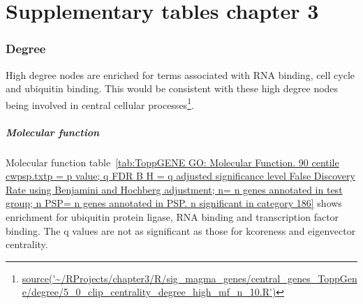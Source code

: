 \chapter{Supplementary tables chapter 3}
\subsection{Degree}
High degree nodes are enriched for terms associated with RNA binding, cell cycle and ubiquitin binding. This would be consistent with these high degree nodes being involved in central cellular processes\footnote{\url{source('~/RProjects/chapter3/R/sig_magma_genes/central_genes_ToppGene/degree/5_0_clip_centrality_degree_high_mf_n_10.R')}}.

\paragraph{Molecular function}
Molecular function table~\ref{tab:ToppGENE GO: Molecular Function. 90 centile cwpsp.txtp = p value; q FDR B H = q adjusted significance level False Discovery Rate using Benjamini and Hochberg adjustment; n= n genes annotated in test group; n PSP= n genes annotated in PSP. n significant in category 186} shows enrichment for ubiquitin protein ligase, RNA binding and transcription factor binding. The q values are not as significant as those for kcoreness and eigenvector centrality.


